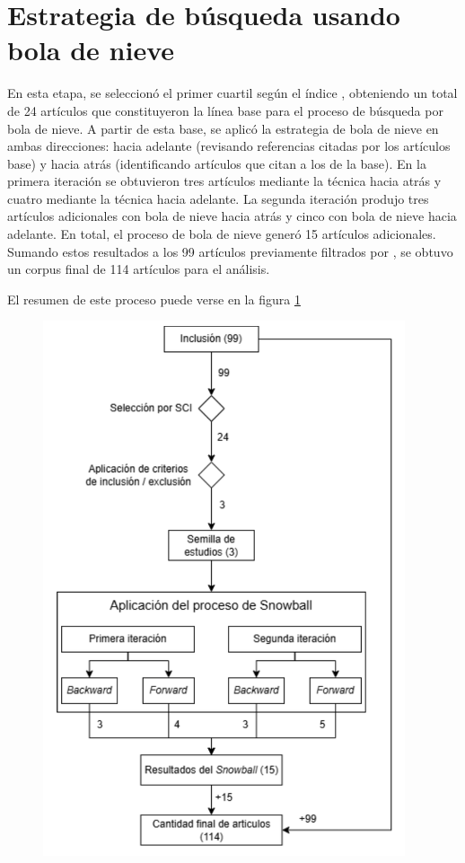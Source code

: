 \section{Estrategia de búsqueda usando bola de nieve}\label{sec:bolaDeNieve}
\noindent

En esta etapa, se seleccionó el primer cuartil según el índice \SCI, obteniendo un total de 24 artículos que constituyeron la línea base para el proceso de búsqueda por bola de nieve. A partir de esta base, se aplicó la estrategia de bola de nieve en ambas direcciones: hacia adelante (revisando referencias citadas por los artículos base) y hacia atrás (identificando artículos que citan a los de la base). En la primera iteración se obtuvieron tres artículos mediante la técnica hacia atrás y cuatro mediante la técnica hacia adelante. La segunda iteración produjo tres artículos adicionales con bola de nieve hacia atrás y cinco con bola de nieve hacia adelante. En total, el proceso de bola de nieve generó 15 artículos adicionales. Sumando estos resultados a los 99 artículos previamente filtrados por \SCI, se obtuvo un corpus final de 114 artículos para el análisis.

El resumen de este proceso puede verse en la figura \ref{fig:resumen-snowball}

\begin{figure}[H]
	\begin{center}
		\includegraphics[width=0.95\textwidth]{tablas-images/sms/resumen-snowball.png}
	\end{center}
	\caption{}\label{fig:resumen-snowball}
\end{figure}


